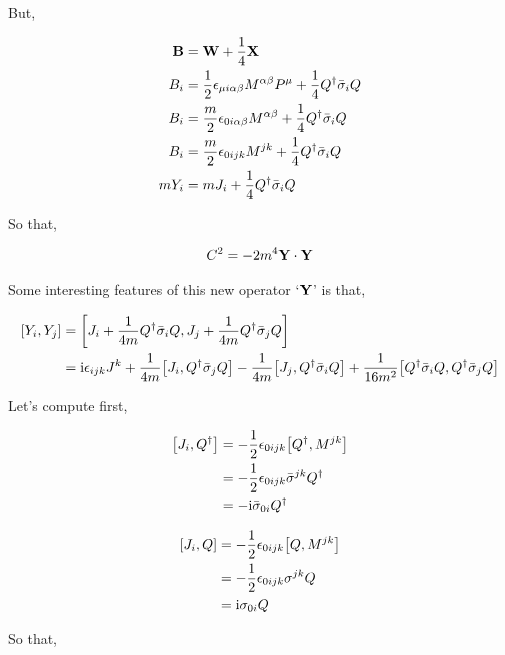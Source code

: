 But,

\begin{align}
    \vb B&=\vb W+\frac14\vb X\nonumber\\
    B_i&=\frac12\epsilon_{\mu i\alpha\beta}M^{\alpha\beta}P^\mu+\frac14Q^\dagger{\bar\sigma}_i Q\nonumber\\
    B_i&=\frac m2\epsilon_{0i\alpha\beta}M^{\alpha\beta}+\frac14Q^\dagger{\bar\sigma}_i Q\nonumber\\
    B_i&=\frac m2\epsilon_{0ijk}M^{jk}+\frac14Q^\dagger{\bar\sigma}_i Q\nonumber\\
    mY_i&=mJ_i+\frac14Q^\dagger{\bar\sigma}_i Q\nonumber
\end{align}

So that,

\begin{align}
    C^2=-2m^4 \vb Y\cdot \vb Y\nonumber
\end{align}

Some interesting features of this new operator `$\vb Y$' is that,

\begin{align}
    \comm{Y_i}{Y_j}&=\comm{J_i+\frac{1}{4m}Q^\dagger{\bar\sigma}_i Q}{J_j+\frac{1}{4m}Q^\dagger{\bar\sigma}_j Q}\nonumber\\
    &=\im\epsilon_{ijk}J^k+\frac{1}{4m}\comm{J_i}{Q^\dagger{\bar\sigma}_j Q}-\frac{1}{4m}\comm{J_j}{Q^\dagger{\bar\sigma}_i Q}+\frac{1}{16m^2}\comm{Q^\dagger{\bar\sigma}_i Q}{Q^\dagger{\bar\sigma}_j Q}\nonumber
\end{align}

Let's compute first,

\begin{align}
    \comm{J_i}{Q^\dagger}&=-\frac12\epsilon_{0ijk}\comm{Q^\dagger}{M^{jk}}\nonumber\\
    &=-\frac12\epsilon_{0ijk}{\bar\sigma}^{jk}Q^\dagger\nonumber\\
    &=-\im{\bar\sigma}_{0i}Q^\dagger\nonumber
\end{align}

\begin{align}
    \comm{J_i}{Q}&=-\frac12\epsilon_{0ijk}\comm{Q}{M^{jk}}\nonumber\\
    &=-\frac12\epsilon_{0ijk}{\sigma}^{jk}Q\nonumber\\
    &=\im{\sigma}_{0i}Q\nonumber
\end{align}

So that,

